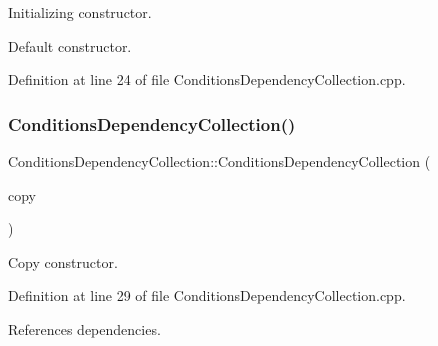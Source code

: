 Initializing constructor. 

Default constructor. 

Definition at line 24 of file Conditions\+Dependency\+Collection.\+cpp.

\hypertarget{class_d_d4hep_1_1_conditions_1_1_conditions_dependency_collection_a244d8717b93fb02a5899b00556a16da4}{}\label{class_d_d4hep_1_1_conditions_1_1_conditions_dependency_collection_a244d8717b93fb02a5899b00556a16da4} 
\subsubsection{\texorpdfstring{Conditions\+Dependency\+Collection()}{ConditionsDependencyCollection()}\hspace{0.1cm}{\footnotesize\ttfamily [2/2]}}
{\footnotesize\ttfamily Conditions\+Dependency\+Collection\+::\+Conditions\+Dependency\+Collection (\begin{DoxyParamCaption}\item[{const \hyperlink{class_d_d4hep_1_1_conditions_1_1_conditions_dependency_collection}{Conditions\+Dependency\+Collection} \&}]{copy }\end{DoxyParamCaption})}



Copy constructor. 



Definition at line 29 of file Conditions\+Dependency\+Collection.\+cpp.



References dependencies.

\hypertarget{class_d_d4hep_1_1_conditions_1_1_conditions_dependency_collection_ad09c3071e28a0cae78a9bc8945331619}{}\label{class_d_d4hep_1_1_conditions_1_1_conditions_dependency_collection_ad09c3071e28a0cae78a9bc8945331619} 
